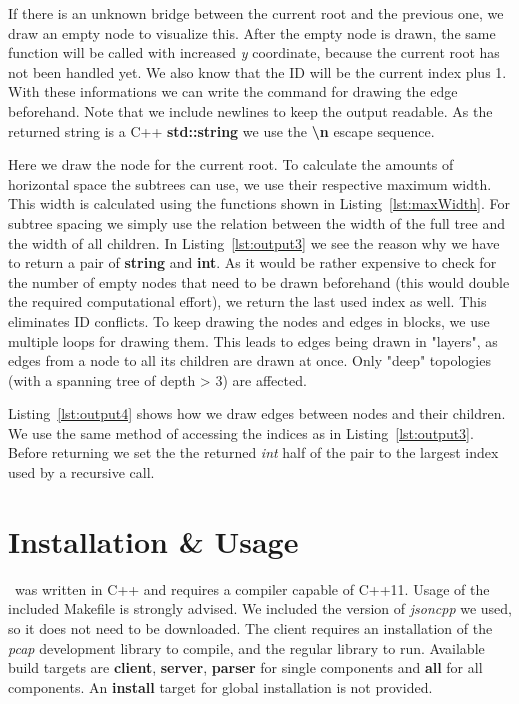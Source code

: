 
If there is an unknown bridge between the current root and the previous one, we draw an empty node to visualize this.
After the empty node is drawn, the same function will be called with increased \textit{y} coordinate, because the current root has not been handled yet.
We also know that the ID will be the current index plus 1.
With these informations we can write the command for drawing the edge beforehand.
Note that we include newlines to keep the output readable.
As the returned string is a C++ \textbf{std::string} we use the \textbf{\textbackslash n} escape sequence.


Here we draw the node for the current root.
To calculate the amounts of horizontal space the subtrees can use, we use their respective maximum width.
This width is calculated using the functions shown in Listing~\ref{lst:maxWidth}.
For subtree spacing we simply use the relation between the width of the full tree and the width of all children.
In Listing~\ref{lst:output3} we see the reason why we have to return a pair of \textbf{string} and \textbf{int}.
As it would be rather expensive to check for the number of empty nodes that need to be drawn beforehand (this would double the required computational effort), we return the last used index as well.
This eliminates ID conflicts.
To keep drawing the nodes and edges in blocks, we use multiple loops for drawing them.
This leads to edges being drawn in "layers", as edges from a node to all its children are drawn at once.
Only "deep" topologies (with a spanning tree of depth > 3) are affected.%


Listing~\ref{lst:output4} shows how we draw edges between nodes and their children.
We use the same method of accessing the indices as in Listing~\ref{lst:output3}.
Before returning we set the the returned \textit{int} half of the pair to the largest index used by a recursive call.



\section{Installation \& Usage}
\tool\ was written in C++ and requires a compiler capable of C++11.
Usage of the included Makefile is strongly advised.
We included the version of \textit{jsoncpp} we used, so it does not need to be downloaded.
The client requires an installation of the \textit{pcap} development library to compile, and the regular library to run.
Available build targets are \textbf{client}, \textbf{server}, \textbf{parser} for single components and \textbf{all} for all components.
An \textbf{install} target for global installation is not provided.
